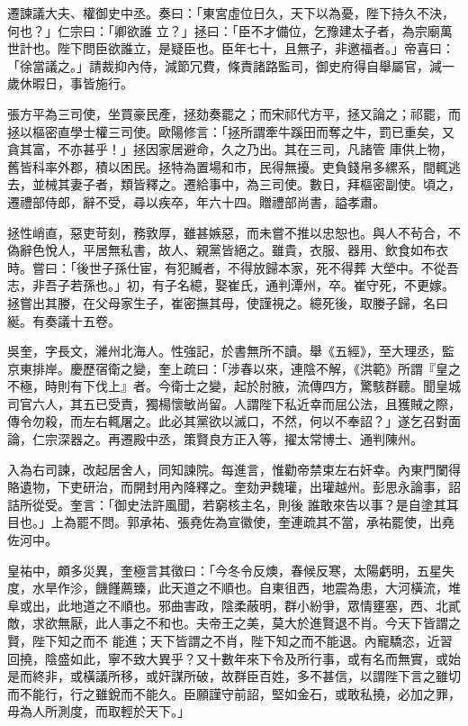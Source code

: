 \begin{pinyinscope}
 遷諫議大夫、權御史中丞。奏曰：「東宮虛位日久，天下以為憂，陛下持久不決，何也？」仁宗曰：「卿欲誰
 立？」拯曰：「臣不才備位，乞豫建太子者，為宗廟萬世計也。陛下問臣欲誰立，是疑臣也。臣年七十，且無子，非邀福者。」帝喜曰：「徐當議之。」請裁抑內侍，減節冗費，條責諸路監司，御史府得自舉屬官，減一歲休暇日，事皆施行。



 張方平為三司使，坐買豪民產，拯劾奏罷之；而宋祁代方平，拯又論之；祁罷，而拯以樞密直學士權三司使。歐陽修言：「拯所謂牽牛蹊田而奪之牛，罰已重矣，又貪其富，不亦甚乎！」拯因家居避命，久之乃出。其在三司，凡諸管
 庫供上物，舊皆科率外郡，積以困民。拯特為置場和市，民得無擾。吏負錢帛多縲系，間輒逃去，並械其妻子者，類皆釋之。遷給事中，為三司使。數日，拜樞密副使。頃之，遷禮部侍郎，辭不受，尋以疾卒，年六十四。贈禮部尚書，謚孝肅。



 拯性峭直，惡吏苛刻，務敦厚，雖甚嫉惡，而未嘗不推以忠恕也。與人不茍合，不偽辭色悅人，平居無私書，故人、親黨皆絕之。雖貴，衣服、器用、飲食如布衣時。嘗曰：「後世子孫仕宦，有犯贓者，不得放歸本家，死不得葬
 大塋中。不從吾志，非吾子若孫也。」初，有子名繶，娶崔氏，通判潭州，卒。崔守死，不更嫁。拯嘗出其媵，在父母家生子，崔密撫其母，使謹視之。繶死後，取媵子歸，名曰綖。有奏議十五卷。



 吳奎，字長文，濰州北海人。性強記，於書無所不讀。舉《五經》，至大理丞，監京東排岸。慶歷宿衛之變，奎上疏曰：「涉春以來，連陰不解，《洪範》所謂『皇之不極，時則有下伐上』者。今衛士之變，起於肘腋，流傳四方，驚駭群聽。聞皇城
 司官六人，其五已受責，獨楊懷敏尚留。人謂陛下私近幸而屈公法，且獲賊之際，傳令勿殺，而左右輒屠之。此必其黨欲以滅口，不然，何以不奉詔？」遂乞召對面論，仁宗深器之。再遷殿中丞，策賢良方正入等，擢太常博士、通判陳州。



 入為右司諫，改起居舍人，同知諫院。每進言，惟勸帝禁束左右奸幸。內東門闌得賂遺物，下吏研治，而開封用內降釋之。奎劾尹魏瓘，出瓘越州。彭思永論事，詔詰所從受。奎言：「御史法許風聞，若窮核主名，則後
 誰敢來告以事？是自塗其耳目也。」上為罷不問。郭承祐、張堯佐為宣徽使，奎連疏其不當，承祐罷使，出堯佐河中。



 皇祐中，頗多災異，奎極言其徵曰：「今冬令反燠，春候反寒，太陽虧明，五星失度，水旱作沴，饑饉薦臻，此天道之不順也。自東徂西，地震為患，大河橫流，堆阜或出，此地道之不順也。邪曲害政，陰柔蔽明，群小紛爭，眾情壅塞，西、北貳敵，求欲無厭，此人事之不和也。夫帝王之美，莫大於進賢退不肖。今天下皆謂之賢，陛下知之而不
 能進；天下皆謂之不肖，陛下知之而不能退。內寵驕恣，近習回撓，陰盛如此，寧不致大異乎？又十數年來下令及所行事，或有名而無實，或始是而終非，或橫議所移，或奸謀所破，故群臣百姓，多不甚信，以謂陛下言之雖切而不能行，行之雖銳而不能久。臣願謹守前詔，堅如金石，或敢私撓，必加之罪，毋為人所測度，而取輕於天下。」




\end{pinyinscope}
